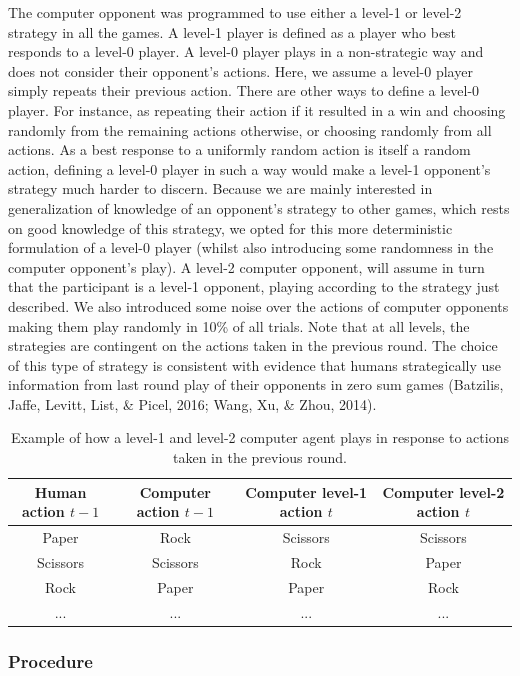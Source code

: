 \documentclass[
  english,
  man,floatsintext]{apa6}
\begin{document}
The computer opponent was programmed to use either a level-1 or level-2 strategy in all the games. A level-1 player is defined as a player who best responds to a level-0 player. A level-0 player plays in a non-strategic way and does not consider their opponent's actions. Here, we assume a level-0 player simply repeats their previous action. There are other ways to define a level-0 player. For instance, as repeating their action if it resulted in a win and choosing randomly from the remaining actions otherwise, or choosing randomly from all actions. As a best response to a uniformly random action is itself a random action, defining a level-0 player in such a way would make a level-1 opponent's strategy much harder to discern. Because we are mainly interested in generalization of knowledge of an opponent's strategy to other games, which rests on good knowledge of this strategy, we opted for this more deterministic formulation of a level-0 player (whilst also introducing some randomness in the computer opponent's play). A level-2 computer opponent, will assume in turn that the participant is a level-1 opponent, playing according to the strategy just described. We also introduced some noise over the actions of computer opponents making them play randomly in 10\% of all trials. Note that at all levels, the strategies are contingent on the actions taken in the previous round. The choice of this type of strategy is consistent with evidence that humans strategically use information from last round play of their opponents in zero sum games (Batzilis, Jaffe, Levitt, List, \& Picel, 2016; Wang, Xu, \& Zhou, 2014).

\begin{table}[bth!]
\centering
\begin{tabular}{||c c | c c||} 
 \hline
 Human action $t-1$ & Computer action $t-1$  & Computer level-1 action $t$ & Computer level-2 action $t$ \\ [0.5ex] 
 \hline\hline
 Paper & Rock & Scissors & Scissors \\ 
 Scissors  & Scissors & Rock & Paper \\
 Rock & Paper & Paper & Rock \\
 ... & ... & ... & ... \\ [1ex] 
 \hline
\end{tabular}
\caption{Example of how a level-1 and level-2 computer agent plays in response to actions taken in the previous round.}
\label{table:1}
\end{table}

\hypertarget{procedure}{%
\subsubsection{Procedure}\label{procedure}}
\end{document}
